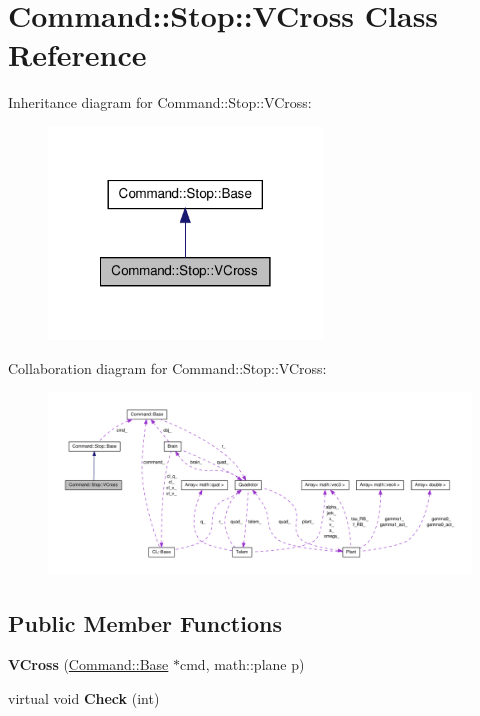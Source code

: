 \hypertarget{classCommand_1_1Stop_1_1VCross}{\section{\-Command\-:\-:\-Stop\-:\-:\-V\-Cross \-Class \-Reference}
\label{classCommand_1_1Stop_1_1VCross}
}


\-Inheritance diagram for \-Command\-:\-:\-Stop\-:\-:\-V\-Cross\-:\nopagebreak
\begin{figure}[H]
\begin{center}
\leavevmode
\includegraphics[width=206pt]{classCommand_1_1Stop_1_1VCross__inherit__graph}
\end{center}
\end{figure}


\-Collaboration diagram for \-Command\-:\-:\-Stop\-:\-:\-V\-Cross\-:\nopagebreak
\begin{figure}[H]
\begin{center}
\leavevmode
\includegraphics[width=350pt]{classCommand_1_1Stop_1_1VCross__coll__graph}
\end{center}
\end{figure}
\subsection*{\-Public \-Member \-Functions}
\begin{DoxyCompactItemize}
\item 
\hypertarget{classCommand_1_1Stop_1_1VCross_af8efe94d12d562f53dd32819947b7e16}{{\bfseries \-V\-Cross} (\hyperlink{classCommand_1_1Base}{\-Command\-::\-Base} $\ast$cmd, math\-::plane p)}\label{classCommand_1_1Stop_1_1VCross_af8efe94d12d562f53dd32819947b7e16}

\item 
\hypertarget{classCommand_1_1Stop_1_1VCross_a973ed85dc311fa2df5d83a78ca8f2b54}{virtual void {\bfseries \-Check} (int)}\label{classCommand_1_1Stop_1_1VCross_a973ed85dc311fa2df5d83a78ca8f2b54}

\end{DoxyCompactItemize}
